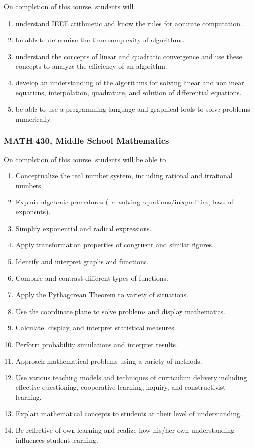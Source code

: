 \documentclass[10pt]{article}
\newenvironment{alphalist}{
\begin{enumerate}[label=(\arabic*),widest=107 ,leftmargin=25pt, itemsep=0pt]}
{\end{enumerate}}
\begin{document}
On completion of this course, students will
\begin{alphalist}
    \item understand IEEE arithmetic and know the rules for accurate computation.
    \item be able to determine the time complexity of algorithms.
    \item understand the concepts of linear and quadratic convergence and use these concepts to analyze the efficiency of an algorithm.
    \item develop an understanding of the algorithms for solving linear and nonlinear equations, interpolation, 
       quadrature, and solution of differential equations.
    \item be able to use a programming language and graphical tools to solve problems numerically.
\end{alphalist}

\subsubsection*{MATH 430,  Middle School Mathematics}

On completion of this course, students will be able to 
\begin{alphalist}
\item Conceptualize the real number system, including rational and irrational numbers. 
\item Explain algebraic procedures (i.e. solving equations/inequalities, laws of exponents). 
\item Simplify exponential and radical expressions. 
\item Apply transformation properties of congruent and similar figures. 
\item Identify and interpret graphs and functions. 
\item Compare and contrast different types of functions. 
\item Apply the Pythagorean Theorem to variety of situations. 
\item Use the coordinate plane to solve problems and display mathematics. 
\item Calculate, display, and interpret statistical measures. 
\item Perform probability simulations and interpret results. 
\item Approach mathematical problems using a variety of methods. 
\item Use various teaching models and techniques of curriculum delivery including effective questioning, cooperative learning, inquiry, and constructivist learning. 
\item Explain mathematical concepts to students at their level of understanding. 
\item Be reflective of own learning and realize how his/her own understanding influences student learning.
\end{alphalist}
\end{document}
